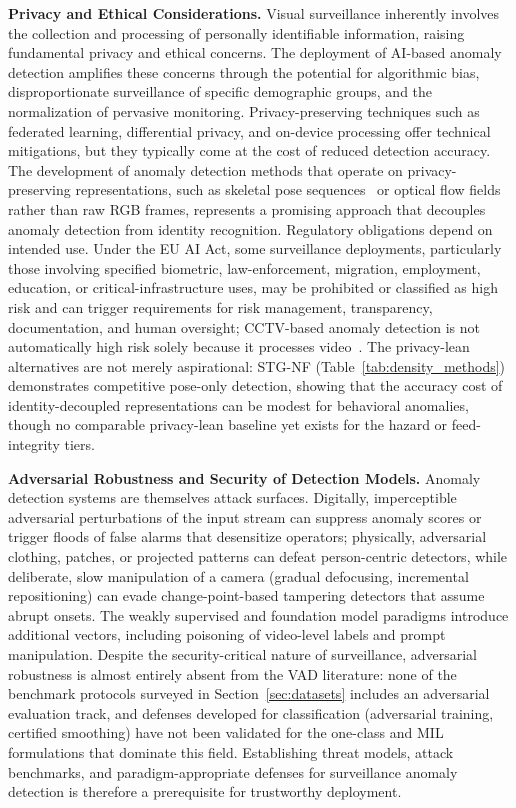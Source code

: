 \documentclass[10pt,a4paper]{article}
\begin{document}
\noindent\textbf{Privacy and Ethical Considerations.} Visual surveillance inherently involves the collection and processing of personally identifiable information, raising fundamental privacy and ethical concerns. The deployment of AI-based anomaly detection amplifies these concerns through the potential for algorithmic bias, disproportionate surveillance of specific demographic groups, and the normalization of pervasive monitoring. Privacy-preserving techniques such as federated learning, differential privacy, and on-device processing offer technical mitigations, but they typically come at the cost of reduced detection accuracy. The development of anomaly detection methods that operate on privacy-preserving representations, such as skeletal pose sequences~\citep{morais2019learning, hirschorn2023normalizing} or optical flow fields rather than raw RGB frames, represents a promising approach that decouples anomaly detection from identity recognition. Regulatory obligations depend on intended use. Under the EU AI Act, some surveillance deployments, particularly those involving specified biometric, law-enforcement, migration, employment, education, or critical-infrastructure uses, may be prohibited or classified as high risk and can trigger requirements for risk management, transparency, documentation, and human oversight; CCTV-based anomaly detection is not automatically high risk solely because it processes video~\citep{eu2024aiact}. The privacy-lean alternatives are not merely aspirational: STG-NF (Table~\ref{tab:density_methods}) demonstrates competitive pose-only detection, showing that the accuracy cost of identity-decoupled representations can be modest for behavioral anomalies, though no comparable privacy-lean baseline yet exists for the hazard or feed-integrity tiers.

\noindent\textbf{Adversarial Robustness and Security of Detection Models.} Anomaly detection systems are themselves attack surfaces. Digitally, imperceptible adversarial perturbations of the input stream can suppress anomaly scores or trigger floods of false alarms that desensitize operators; physically, adversarial clothing, patches, or projected patterns can defeat person-centric detectors, while deliberate, slow manipulation of a camera (gradual defocusing, incremental repositioning) can evade change-point-based tampering detectors that assume abrupt onsets. The weakly supervised and foundation model paradigms introduce additional vectors, including poisoning of video-level labels and prompt manipulation. Despite the security-critical nature of surveillance, adversarial robustness is almost entirely absent from the VAD literature: none of the benchmark protocols surveyed in Section~\ref{sec:datasets} includes an adversarial evaluation track, and defenses developed for classification (adversarial training, certified smoothing) have not been validated for the one-class and MIL formulations that dominate this field. Establishing threat models, attack benchmarks, and paradigm-appropriate defenses for surveillance anomaly detection is therefore a prerequisite for trustworthy deployment.
\end{document}
